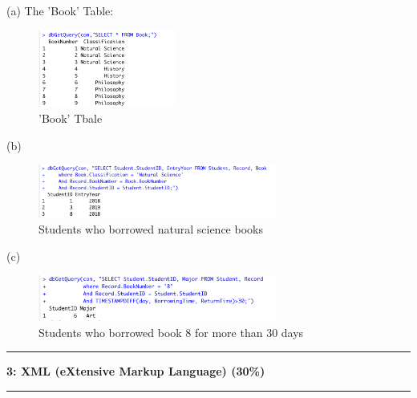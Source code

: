 \documentclass[11pt]{article}
\newcommand\question[2]{\vspace{.25in}\hrule\textbf{#1: #2}\vspace{.5em}\hrule\vspace{.10in}}
\begin{document}
(a) The 'Book' Table:
\begin{figure}[H]
    \centering
    \includegraphics[width=0.4\textwidth]{figures/Q2.1.png}
    \caption{'Book' Tbale}
\end{figure}
(b) 
\begin{figure}[H]
    \centering
    \includegraphics[width=0.7\textwidth]{figures/Q2.2.png}
    \caption{Students who borrowed natural science books}
\end{figure}
(c)
\begin{figure}[H]
    \centering
    \includegraphics[width=0.7\textwidth]{figures/Q2.3.png}
    \caption{Students who borrowed book 8 for more than 30 days}
\end{figure}

\question{3}{XML (eXtensive Markup Language) (30\%)}
\end{document}

